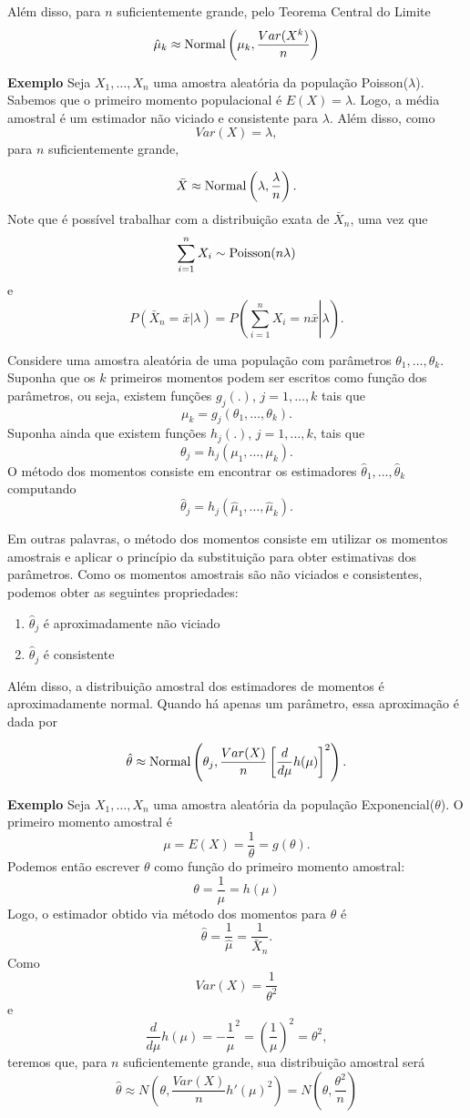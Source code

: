 \documentclass[
  letterpaper,
  DIV=11,
  numbers=noendperiod]{scrartcl}
\providecommand{\tightlist}{%
  \setlength{\itemsep}{0pt}\setlength{\parskip}{0pt}}\usepackage{longtable,booktabs,array}
\begin{document}
Além disso, para \(n\) suficientemente grande, pelo Teorema Central do
Limite
\[\hat{\mu}_k\approx \hbox{Normal}\left(\mu_k,\frac{Var(X^k)}{n}\right)\]

\textbf{Exemplo} Seja \(X_1,\ldots,X_n\) uma amostra aleatória da
população Poisson(\(\lambda\)). Sabemos que o primeiro momento
populacional é \(E(X)=\lambda\). Logo, a média amostral é um estimador
não viciado e consistente para \(\lambda\). Além disso, como
\[Var(X)=\lambda,\] para \(n\) suficientemente grande,

\[\bar{X}\approx \hbox{Normal}\left(\lambda,\frac{\lambda}{n}\right).\]
Note que é possível trabalhar com a distribuição exata de \(\bar{X}_n\),
uma vez que \[\sum_{i=1}^n X_i\sim\hbox{Poisson}(n\lambda)\] e
\[P(\bar{X}_n=\bar{x}|\lambda)=P\left(\left.\sum_{i=1}^n X_i=n\bar{x}\right|\lambda\right).\]

Considere uma amostra aleatória de uma população com parâmetros
\(\theta_1,\ldots,\theta_k\). Suponha que os \(k\) primeiros momentos
podem ser escritos como função dos parâmetros, ou seja, existem funções
\(g_j(.)\), \(j=1,\ldots,k\) tais que
\[\mu_k=g_j(\theta_1,\ldots,\theta_k).\] Suponha ainda que existem
funções \(h_j(.)\), \(j=1,\ldots,k\), tais que
\[\theta_j=h_j(\mu_1,\ldots,\mu_k).\] O método dos momentos consiste em
encontrar os estimadores \(\hat{\theta}_1,\ldots,\hat{\theta}_k\)
computando \[\hat{\theta}_j=h_j(\hat{\mu}_1,\ldots,\hat{\mu}_k).\]

Em outras palavras, o método dos momentos consiste em utilizar os
momentos amostrais e aplicar o princípio da substituição para obter
estimativas dos parâmetros. Como os momentos amostrais são não viciados
e consistentes, podemos obter as seguintes propriedades:

\begin{enumerate}
\def\labelenumi{\arabic{enumi}.}
\tightlist
\item
  \(\hat{\theta}_j\) é aproximadamente não viciado
\item
  \(\hat{\theta}_j\) é consistente
\end{enumerate}

Além disso, a distribuição amostral dos estimadores de momentos é
aproximadamente normal. Quando há apenas um parâmetro, essa aproximação
é dada por

\[\hat{\theta}\approx \hbox{Normal}\left( \theta_j,\frac{Var(X)}{n}\left[\frac{d}{d\mu}h(\mu)\right]^2 \right).\]

\textbf{Exemplo} Seja \(X_1,\ldots,X_n\) uma amostra aleatória da
população Exponencial(\(\theta\)). O primeiro momento amostral é
\[\mu=E(X)=\frac{1}{\theta}=g(\theta).\] Podemos então escrever
\(\theta\) como função do primeiro momento amostral:
\[\theta=\frac{1}{\mu}=h(\mu)\] Logo, o estimador obtido via método dos
momentos para \(\theta\) é
\[\hat{\theta}=\frac{1}{\hat{\mu}}=\frac{1}{\bar{X}_n}.\] Como
\[Var(X)=\frac{1}{\theta^2}\] e
\[\frac{d}{d\mu}h(\mu)=-\frac{1}{\mu}^2=\left(\frac{1}{\mu}\right)^2=\theta^2,\]
teremos que, para \(n\) suficientemente grande, sua distribuição
amostral será
\[\hat{\theta}\approx N\left(\theta,\frac{Var(X)}{n}h'(\mu)^2\right)=N\left(\theta,\frac{\theta^2}{n}\right)\]
\end{document}

